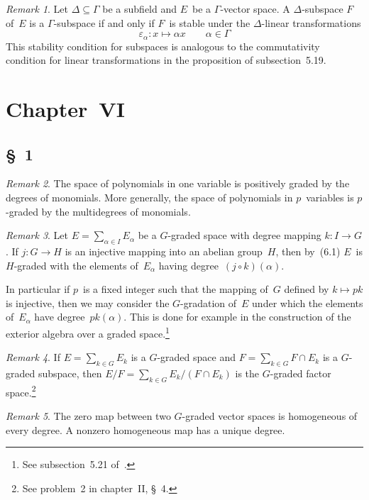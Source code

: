 \documentclass[letterpaper,12pt]{article}
\newcommand{\sect}{\cap}
\newcommand{\after}{\circ}
\theoremstyle{definition}
\theoremstyle{remark}
\newtheorem*{rmk}{Remark}
\begin{document}
\begin{rmk}
Let \(\Delta\subseteq\Gamma\) be a subfield and \(E\)~be a \(\Gamma\)-vector space. A \(\Delta\)-subspace \(F\) of~\(E\) is a \(\Gamma\)-subspace if and only if \(F\)~is stable under the \(\Delta\)-linear transformations
\[\varepsilon_{\alpha}:x\mapsto\alpha x\qquad\alpha\in\Gamma\]
This stability condition for subspaces is analogous to the commutativity condition for linear transformations in the proposition of subsection~5.19.
\end{rmk}

\section*{Chapter~VI}
\subsection*{\S~1}
\begin{rmk}
The space of polynomials in one variable is positively graded by the degrees of monomials. More generally, the space of polynomials in \(p\)~variables is \(p\)-graded by the multidegrees of monomials.
\end{rmk}

\begin{rmk}
Let \(E=\sum_{\alpha\in I}E_{\alpha}\) be a \(G\)-graded space with degree mapping \(k:I\to G\). If \(j:G\to H\) is an injective mapping into an abelian group~\(H\), then by~(6.1) \(E\)~is \(H\)-graded with the elements of~\(E_{\alpha}\) having degree~\((j\after k)(\alpha)\).

In particular if \(p\)~is a fixed integer such that the mapping of~\(G\) defined by \(k\mapsto pk\) is injective, then we may consider the \(G\)-gradation of~\(E\) under which the elements of~\(E_{\alpha}\) have degree~\(pk(\alpha)\). This is done for example in the construction of the exterior algebra over a graded space.\footnote{See subsection~5.21 of~\cite{greub2}.}
\end{rmk}

\begin{rmk}
If \(E=\sum_{k\in G}E_k\) is a \(G\)-graded space and \(F=\sum_{k\in G}F\sect E_k\) is a \(G\)-graded subspace, then \(E/F=\sum_{k\in G}E_k/(F\sect E_k)\) is the \(G\)-graded factor space.\footnote{See problem~2 in chapter~II, \S~4.}
\end{rmk}

\begin{rmk}
The zero map between two \(G\)-graded vector spaces is homogeneous of every degree. A nonzero homogeneous map has a unique degree.
\end{rmk}
\end{document}
